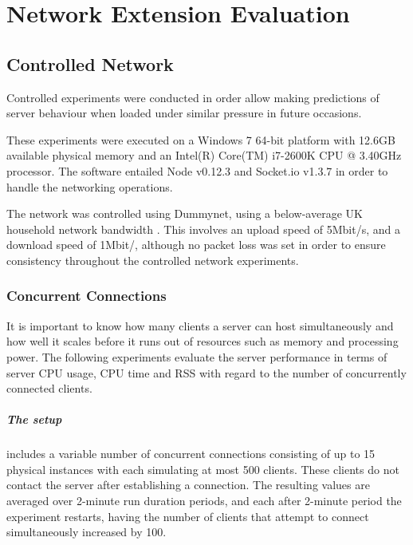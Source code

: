 \documentclass[bsc,frontabs,twoside,singlespacing,parskip,deptreport]{infthesis}     %
\begin{document}
\chapter{Network Extension Evaluation}

\section{Controlled Network}
Controlled experiments were conducted in order allow making predictions of server behaviour when loaded under similar pressure in future occasions.

These experiments were executed on a Windows 7 64-bit platform with 12.6GB available physical memory and an Intel(R) Core(TM) i7-2600K CPU @ 3.40GHz processor. The software entailed Node v0.12.3 and Socket.io v1.3.7 in order to handle the networking operations.

The network was controlled using Dummynet, using a below-average UK household network bandwidth \cite{household_bandwidth}. This involves an upload speed of 5Mbit/s, and a download speed of 1Mbit/, although no packet loss was set in order to ensure consistency throughout the controlled network experiments.

\subsection{Concurrent Connections}
It is important to know how many clients a server can host simultaneously and how well it scales before it runs out of resources such as memory and processing power. The following experiments evaluate the server performance in terms of server CPU usage, CPU time and RSS with regard to the number of concurrently connected clients.

\paragraph*{The setup} includes a variable number of concurrent connections consisting of up to 15 physical instances with each simulating at most 500 clients. These clients  do not contact the server after establishing a connection. The resulting values are averaged over 2-minute run duration periods, and each after 2-minute period the experiment restarts, having the number of clients that attempt to connect simultaneously increased by 100.
\end{document}
